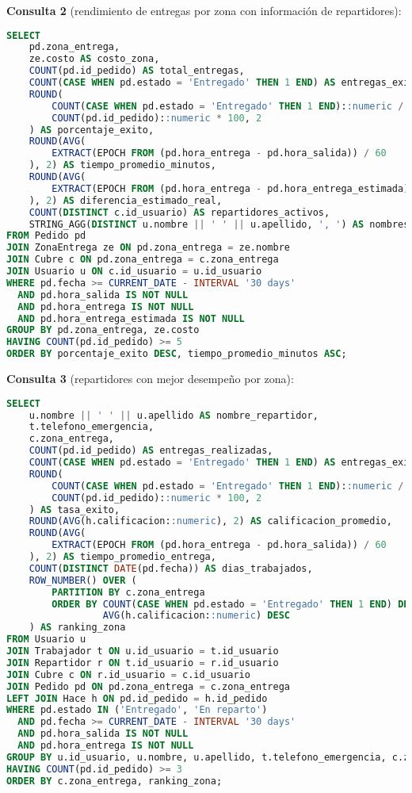 \documentclass[12pt,a4paper]{article}
\begin{document}
\textbf{Consulta 2} (rendimiento de entregas por zona con información de repartidores):
\begin{lstlisting}[language=SQL]
SELECT 
    pd.zona_entrega,
    ze.costo AS costo_zona,
    COUNT(pd.id_pedido) AS total_entregas,
    COUNT(CASE WHEN pd.estado = 'Entregado' THEN 1 END) AS entregas_exitosas,
    ROUND(
        COUNT(CASE WHEN pd.estado = 'Entregado' THEN 1 END)::numeric / 
        COUNT(pd.id_pedido)::numeric * 100, 2
    ) AS porcentaje_exito,
    ROUND(AVG(
        EXTRACT(EPOCH FROM (pd.hora_entrega - pd.hora_salida)) / 60
    ), 2) AS tiempo_promedio_minutos,
    ROUND(AVG(
        EXTRACT(EPOCH FROM (pd.hora_entrega - pd.hora_entrega_estimada)) / 60
    ), 2) AS diferencia_estimado_real,
    COUNT(DISTINCT c.id_usuario) AS repartidores_activos,
    STRING_AGG(DISTINCT u.nombre || ' ' || u.apellido, ', ') AS nombres_repartidores
FROM Pedido pd
JOIN ZonaEntrega ze ON pd.zona_entrega = ze.nombre
JOIN Cubre c ON pd.zona_entrega = c.zona_entrega
JOIN Usuario u ON c.id_usuario = u.id_usuario
WHERE pd.fecha >= CURRENT_DATE - INTERVAL '30 days'
  AND pd.hora_salida IS NOT NULL
  AND pd.hora_entrega IS NOT NULL
  AND pd.hora_entrega_estimada IS NOT NULL
GROUP BY pd.zona_entrega, ze.costo
HAVING COUNT(pd.id_pedido) >= 5
ORDER BY porcentaje_exito DESC, tiempo_promedio_minutos ASC;
\end{lstlisting}

\textbf{Consulta 3} (repartidores con mejor desempeño por zona):
\begin{lstlisting}[language=SQL]
SELECT 
    u.nombre || ' ' || u.apellido AS nombre_repartidor,
    t.telefono_emergencia,
    c.zona_entrega,
    COUNT(pd.id_pedido) AS entregas_realizadas,
    COUNT(CASE WHEN pd.estado = 'Entregado' THEN 1 END) AS entregas_exitosas,
    ROUND(
        COUNT(CASE WHEN pd.estado = 'Entregado' THEN 1 END)::numeric / 
        COUNT(pd.id_pedido)::numeric * 100, 2
    ) AS tasa_exito,
    ROUND(AVG(h.calificacion::numeric), 2) AS calificacion_promedio,
    ROUND(AVG(
        EXTRACT(EPOCH FROM (pd.hora_entrega - pd.hora_salida)) / 60
    ), 2) AS tiempo_promedio_entrega,
    COUNT(DISTINCT DATE(pd.fecha)) AS dias_trabajados,
    ROW_NUMBER() OVER (
        PARTITION BY c.zona_entrega 
        ORDER BY COUNT(CASE WHEN pd.estado = 'Entregado' THEN 1 END) DESC,
                 AVG(h.calificacion::numeric) DESC
    ) AS ranking_zona
FROM Usuario u
JOIN Trabajador t ON u.id_usuario = t.id_usuario
JOIN Repartidor r ON t.id_usuario = r.id_usuario
JOIN Cubre c ON r.id_usuario = c.id_usuario
JOIN Pedido pd ON pd.zona_entrega = c.zona_entrega
LEFT JOIN Hace h ON pd.id_pedido = h.id_pedido
WHERE pd.estado IN ('Entregado', 'En reparto')
  AND pd.fecha >= CURRENT_DATE - INTERVAL '30 days'
  AND pd.hora_salida IS NOT NULL
  AND pd.hora_entrega IS NOT NULL
GROUP BY u.id_usuario, u.nombre, u.apellido, t.telefono_emergencia, c.zona_entrega
HAVING COUNT(pd.id_pedido) >= 3
ORDER BY c.zona_entrega, ranking_zona;
\end{lstlisting}
\end{document}
